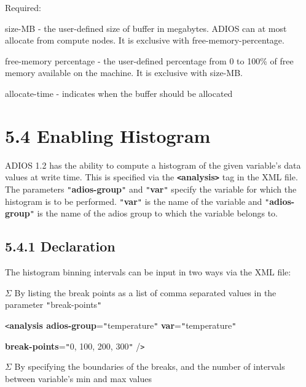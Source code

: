 \leftskip=0pt
Required:

\leftskip=76pt
\parindent=-58pt
size-MB - the user-defined size of  buffer in megabytes. ADIOS can at most allocate 
from compute nodes. It is exclusive with free-memory-percentage.

free-memory percentage - the user-defined percentage from 0 to 100\% of free memory 
available on the machine. It is exclusive with size-MB.

\leftskip=18pt
\parindent=3pt
allocate-time - indicates when the buffer should be allocated\label{HToc84890254}\label{HToc212016630}\label{HToc212016872}\label{HToc182553376}

\section*{{\large 5.4 }{\large \textbf{Enabling Histogram}}}

\leftskip=0pt
\parindent=0pt
ADIOS 1.2 has the ability to {\color{color01} compute a histogram of the given 
variable's data values at write time}. This is specified via the \textbf{\texttt{<}analysis\texttt{>}} 
tag in the XML file. The parameters \texttt{"}\textbf{adios-group}\texttt{"} and 
\texttt{"}\textbf{var}\texttt{"} specify the variable for which the histogram is 
to be performed. \texttt{"}\textbf{var}\texttt{"} is the name of the variable and 
\texttt{"}\textbf{adios-group}\texttt{"} is the name of the adios group to which 
the variable belongs to. \label{HToc182553377}

\subsection*{{\large \textbf{5.4.1 Declaration}}}

The histogram binning intervals can be input in two ways via the XML file:

\ensuremath{\Sigma} By listing the break points as a list of comma separated values 
in the parameter \texttt{"}break-points\texttt{"} 

\leftskip=99pt
\parindent=-59pt
\texttt{<}\textbf{analysis adios-group}=\texttt{"}temperature\texttt{"}    \textbf{var}=\texttt{"}temperature\texttt{"}

\parindent=-63pt
\textbf{break-points}=\texttt{"}0, 100, 200, 300\texttt{"} /\texttt{>}

\leftskip=0pt
\parindent=0pt
\ensuremath{\Sigma} By specifying the boundaries of the breaks, and the number 
of intervals between variable's min and max values


